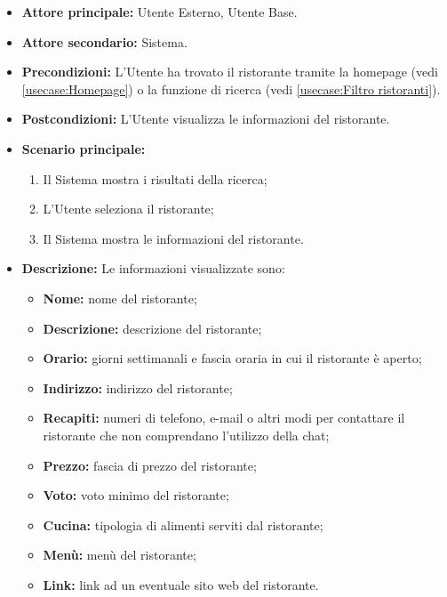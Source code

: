 \label{usecase:Visualizzazione di un ristorante}
\begin{itemize}
	\item \textbf{Attore principale:} Utente Esterno, Utente Base.
	
	\item \textbf{Attore secondario:} Sistema.

	\item \textbf{Precondizioni:} L'Utente ha trovato il ristorante tramite la homepage (vedi \autoref{usecase:Homepage}) o la funzione di ricerca (vedi \autoref{usecase:Filtro ristoranti}).

	\item \textbf{Postcondizioni:} L'Utente visualizza le informazioni del ristorante.

	\item \textbf{Scenario principale:}
		\begin{enumerate}
		    \item Il Sistema mostra i risultati della ricerca;
		    \item L'Utente seleziona il ristorante;
		    \item Il Sistema mostra le informazioni del ristorante.
	    \end{enumerate}

	\item \textbf{Descrizione:} Le informazioni visualizzate sono:
	    \begin{itemize}
			\item \textbf{Nome:} nome del ristorante;
			\item \textbf{Descrizione:} descrizione del ristorante;
		    \item \textbf{Orario:} giorni settimanali e fascia oraria in cui il ristorante è aperto;
		    \item \textbf{Indirizzo:} indirizzo del ristorante;
		    \item \textbf{Recapiti:} numeri di telefono, e-mail o altri modi per contattare il ristorante che non comprendano l'utilizzo della chat;
		    \item \textbf{Prezzo:} fascia di prezzo del ristorante;
		    \item \textbf{Voto:} voto minimo del ristorante;
			\item \textbf{Cucina:} tipologia di alimenti serviti dal ristorante;
		    \item \textbf{Menù:} menù del ristorante;
		    \item \textbf{Link:} link ad un eventuale sito web del ristorante.
	    \end{itemize}
\end{itemize}
